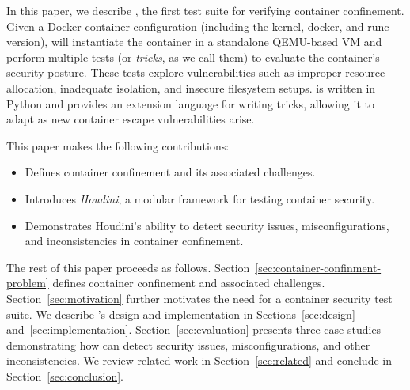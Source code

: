 In this paper, we describe \houdini, the first test suite for verifying container confinement. Given a Docker container configuration (including the kernel, docker, and runc version), \houdini will instantiate the container in a standalone QEMU-based VM and perform multiple tests (or \textit{tricks}, as we call them) to evaluate the container's security posture. These tests explore vulnerabilities such as improper resource allocation, inadequate isolation, and insecure filesystem setups. \houdini is written in Python and provides an extension language for writing tricks, allowing it to adapt as new container escape vulnerabilities arise.




This paper makes the following contributions:
\begin{itemize}
    \item Defines container confinement and its associated challenges.
    \item Introduces \textit{Houdini}, a modular framework for testing container security.
    \item Demonstrates Houdini’s ability to detect security issues, misconfigurations, and inconsistencies in container confinement.
\end{itemize}

The rest of this paper proceeds as follows. Section~\ref{sec:container-confinment-problem} defines container confinement and associated challenges. Section~\ref{sec:motivation} further motivates the need for a container security test suite. We describe \houdini's design and implementation in Sections~\ref{sec:design} and~\ref{sec:implementation}. Section~\ref{sec:evaluation} presents three case studies demonstrating how \houdini can detect security issues, misconfigurations, and other inconsistencies. We review related work in Section~\ref{sec:related} and conclude in Section~\ref{sec:conclusion}.
